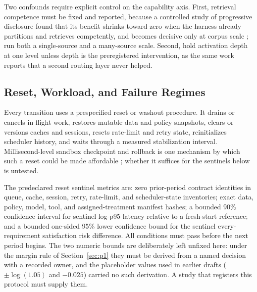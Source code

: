 Two confounds require explicit control on the capability axis. First, retrieval competence must be fixed and reported, because a controlled study of progressive disclosure found that its benefit shrinks toward zero when the harness already partitions and retrieves competently, and becomes decisive only at corpus scale \cite{he2026disclosure}; run both a single-source and a many-source scale. Second, hold activation depth at one level unless depth is the preregistered intervention, as the same work reports that a second routing layer never helped.

\subsection{Reset, Workload, and Failure Regimes}

Every transition uses a prespecified reset or washout procedure. It drains or cancels in-flight work, restores mutable data and policy snapshots, clears or versions caches and sessions, resets rate-limit and retry state, reinitializes scheduler history, and waits through a measured stabilization interval. Millisecond-level sandbox checkpoint and rollback is one mechanism by which such a reset could be made affordable \cite{dong2026deltabox}; whether it suffices for the sentinels below is untested.

The predeclared reset sentinel metrics are: zero prior-period contract identities in queue, cache, session, retry, rate-limit, and scheduler-state inventories; exact data, policy, model, tool, and assigned-treatment manifest hashes; a bounded 90\% confidence interval for sentinel log-p95 latency relative to a fresh-start reference; and a bounded one-sided 95\% lower confidence bound for the sentinel every-requirement satisfaction risk difference. All conditions must pass before the next period begins. The two numeric bounds are deliberately left unfixed here: under the margin rule of Section~\ref{sec:p1} they must be derived from a named decision with a recorded owner, and the placeholder values used in earlier drafts ($\pm\log(1.05)$ and $-0.025$) carried no such derivation. A study that registers this protocol must supply them.

